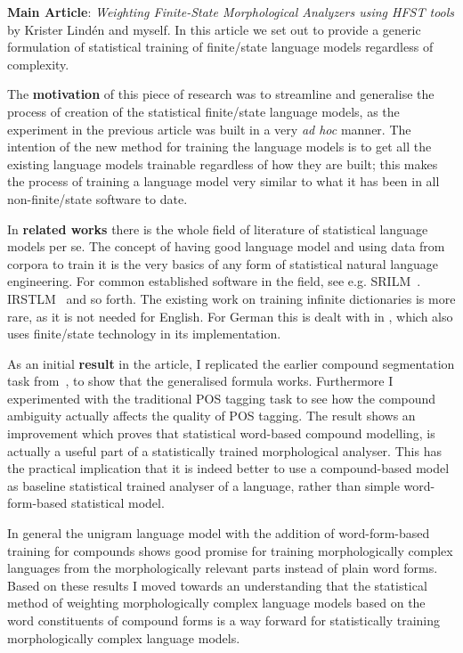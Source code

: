 \documentclass[officiallayout]{unihelcompling}
\begin{document}
\textbf{Main Article}: \emph{Weighting Finite-State Morphological Analyzers
using HFST tools} by Krister Lindén and myself. In this article we set out
to provide a generic formulation of statistical training of finite\-/state
language models regardless of complexity.

The \textbf{motivation} of this piece of research was to streamline and generalise
the process of creation of the statistical finite\-/state language models, as the
experiment in the previous article  was built
in a very \emph{ad hoc} manner. The intention of the new method for training the
language models is to get all the existing language models trainable regardless
of how they are built; this makes the process of training a language model very
similar to what it has been in all non-finite\-/state software to date.

In \textbf{related works} there is the whole field of literature of statistical
language models per se. The concept of having good language model and using
data from corpora to train it is the very basics of any form of statistical
natural language engineering. For common established software in the field, see
e.g.  SRILM~\citep{stolcke2002srilm}. IRSTLM~\citep{federico2008irstlm} and so
forth.  The existing work on training infinite dictionaries is more rare, as it
is not needed for English. For German this is dealt with in
\citep{schiller2006german}, which also uses finite\-/state technology in its
implementation.

As an initial \textbf{result} in the article, I replicated the earlier compound
segmentation task from~, to show that the generalised formula works.
Furthermore I experimented with the traditional POS tagging task to see how the
compound ambiguity actually affects the quality of POS tagging. The result
shows an improvement which proves that statistical word-based compound
modelling, is actually a useful part of a statistically trained morphological
analyser. This has the practical implication that it is indeed better to
use a compound-based model as baseline statistical trained analyser
of a language, rather than simple word-form-based statistical model.

In general the unigram language model with the addition of word-form-based
training for compounds shows good promise for training
morphologically complex languages from the morphologically relevant parts
instead of plain word forms. Based on these results I moved towards an 
understanding that the statistical method of weighting morphologically complex
language models based on the word constituents of compound forms is a way 
forward for statistically training morphologically complex language models.
\end{document}
